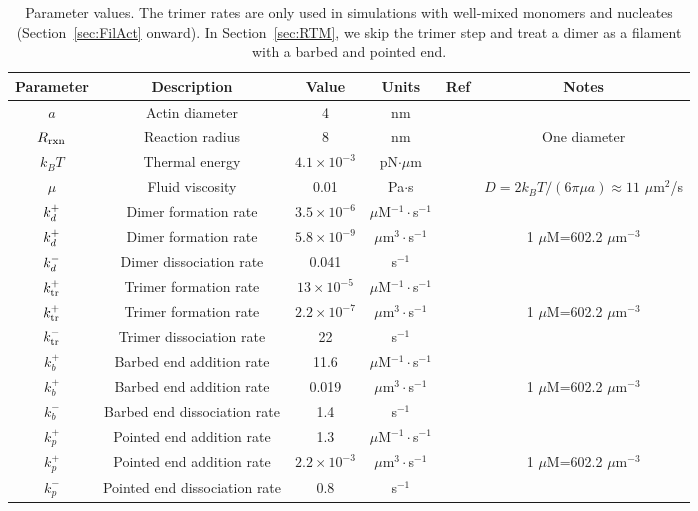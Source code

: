 \documentclass[11pt]{article}
\begin{document}
\begin{table}
\begin{center}
\begin{tabular}{|c|c|c|c|c|c|}\hline
Parameter & Description & Value & Units & Ref & Notes \\ \hline
$a$ & Actin diameter & 4 & nm & & \\
$R_\text{rxn}$ & Reaction radius & 8 & nm & & One diameter \\
$k_B T$ & Thermal energy & $4.1 \times 10^{-3}$ & pN$\cdot \mu$m & & \\ 
$\mu$ & Fluid viscosity & 0.01 & Pa$\cdot$s & & $D=2k_BT/(6 \pi \mu a)\approx 11$ $\mu$m$^2$/s \\  \hline
$k_d^+$ & Dimer formation rate& $3.5 \times 10^{-6}$ & $\mu$M$^{-1}\cdot$s$^{-1}$ & \cite{rosenbloom2021mechanism} & \\ 
$k_d^+$ & Dimer formation rate& $5.8 \times 10^{-9}$ & $\mu$m$^{3} \cdot$s$^{-1}$ & & 1 $\mu$M=602.2 $\mu$m$^{-3}$ \\
$k_d^-$ & Dimer dissociation rate & 0.041 & s$^{-1}$ & \cite{rosenbloom2021mechanism} &\\ \hline
$k_\text{tr}^+$ & Trimer formation rate& $13 \times 10^{-5}$ & $\mu$M$^{-1}\cdot$s$^{-1}$ & \cite{rosenbloom2021mechanism} & \\ 
$k_\text{tr}^+$ & Trimer formation rate& $2.2 \times 10^{-7}$ & $\mu$m$^{3} \cdot$s$^{-1}$ &  & 1 $\mu$M=602.2 $\mu$m$^{-3}$ \\
$k_\text{tr}^-$ & Trimer dissociation rate & 22 & s$^{-1}$ & \cite{rosenbloom2021mechanism} &\\ \hline
$k_b^+$ & Barbed end addition rate& 11.6 & $\mu$M$^{-1}\cdot$s$^{-1}$ & \cite{rosenbloom2021mechanism} & \\ 
$k_b^+$ &  Barbed end addition rate& 0.019 & $\mu$m$^{3} \cdot$s$^{-1}$ &  & 1 $\mu$M=602.2 $\mu$m$^{-3}$ \\
$k_b^-$ & Barbed end dissociation rate & 1.4 & s$^{-1}$ & \cite{rosenbloom2021mechanism} &\\ \hline
$k_p^+$ & Pointed end addition rate& 1.3& $\mu$M$^{-1}\cdot$s$^{-1}$ & \cite{rosenbloom2021mechanism} & \\ 
$k_p^+$ &  Pointed end addition rate& $2.2 \times 10^{-3}$ & $\mu$m$^{3} \cdot$s$^{-1}$ & & 1 $\mu$M=602.2 $\mu$m$^{-3}$ \\
$k_p^-$ & Pointed end dissociation rate & 0.8 & s$^{-1}$ & \cite{rosenbloom2021mechanism} &\\ \hline
\end{tabular}
\caption{\label{tab:params} Parameter values. The trimer rates are only used in simulations with well-mixed monomers and nucleates (Section\ \ref{sec:FilAct} onward). In Section\ \ref{sec:RTM}, we skip the trimer step and treat a dimer as a filament with a barbed and pointed end.}
\end{center}
\end{table}
\end{document}
